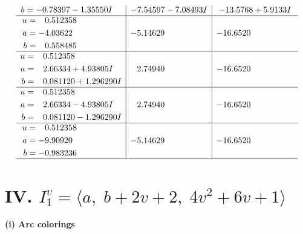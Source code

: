 \documentclass[1p]{elsarticle_modified}
\theoremstyle{definition}
\begin{document}
$$\begin{array}{c|c|c}
\begin{aligned}
b &= -0.78397 - 1.35550 I\end{aligned}
 & -7.54597 - 7.08493 I & -13.5768 + 5.9133 I \\ \hline\begin{aligned}
u &= \phantom{-}0.512358\phantom{ +0.000000I} \\
a &= -4.03622\phantom{ +0.000000I} \\
b &= \phantom{-}0.558485\phantom{ +0.000000I}\end{aligned}
 & -5.14629\phantom{ +0.000000I} & -16.6520\phantom{ +0.000000I} \\ \hline\begin{aligned}
u &= \phantom{-}0.512358\phantom{ +0.000000I} \\
a &= \phantom{-}2.66334 + 4.93805 I \\
b &= \phantom{-}0.081120 + 1.296290 I\end{aligned}
 & \phantom{-}2.74940\phantom{ +0.000000I} & -16.6520\phantom{ +0.000000I} \\ \hline\begin{aligned}
u &= \phantom{-}0.512358\phantom{ +0.000000I} \\
a &= \phantom{-}2.66334 - 4.93805 I \\
b &= \phantom{-}0.081120 - 1.296290 I\end{aligned}
 & \phantom{-}2.74940\phantom{ +0.000000I} & -16.6520\phantom{ +0.000000I} \\ \hline\begin{aligned}
u &= \phantom{-}0.512358\phantom{ +0.000000I} \\
a &= -9.90920\phantom{ +0.000000I} \\
b &= -0.983236\phantom{ +0.000000I}\end{aligned}
 & -5.14629\phantom{ +0.000000I} & -16.6520\phantom{ +0.000000I}\\
 \hline 
 \end{array}$$\newpage\newpage\renewcommand{\arraystretch}{1}
\centering \section*{IV. $I^v_{1}= \langle a,\;b+2 v+2,\;4 v^2+6 v+1 \rangle$}
\flushleft \textbf{(i) Arc colorings}\\
\end{document}

